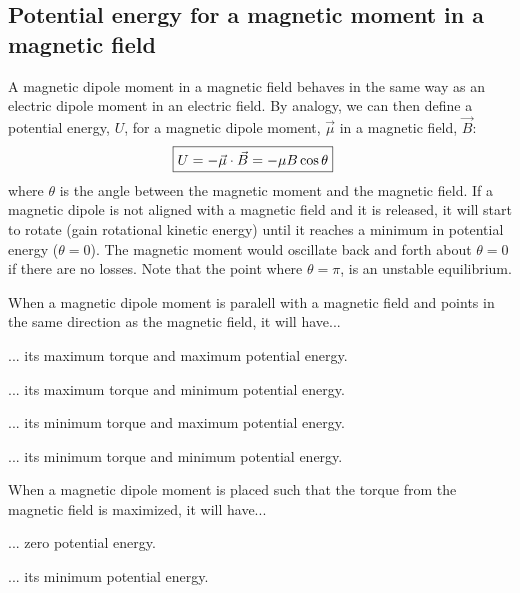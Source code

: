 \subsection{Potential energy for a magnetic moment in a magnetic field}
A magnetic dipole moment in a magnetic field behaves in the same way as an electric dipole moment in an electric field. By analogy, we can then define a potential energy, $U$, for a magnetic dipole moment, $\vec \mu$ in a magnetic field, $\vec B$:
\begin{align*}
\Aboxed{U =-\vec \mu \cdot \vec B =- \mu B \cos\theta}
\end{align*}
where $\theta$ is the angle between the magnetic moment and the magnetic field. If a magnetic dipole is not aligned with a magnetic field and it is released, it will start to rotate (gain rotational kinetic energy) until it reaches a minimum in potential energy ($\theta = 0$). The magnetic moment would oscillate back and forth about $\theta =0$ if there are no losses. Note that the point where $\theta = \pi$, is an unstable equilibrium.
\begin{checkpoint}{}
	\begin{MCquestion}{When a magnetic dipole moment is paralell with a magnetic field and points in the same direction as the magnetic field, it will have...}
		\item ... its maximum torque and maximum potential energy.
		\item ... its maximum torque and minimum potential energy.
		\item ... its minimum torque and maximum potential energy.
		\item ... its minimum torque and minimum potential energy. \correct
	\end{MCquestion}
\end{checkpoint}

\begin{checkpoint}{}
	\begin{MCquestion}{When a magnetic dipole moment is placed such that the torque from the magnetic field is maximized, it will have...}
		\item ... zero potential energy. \correct
		\item ... its minimum potential energy.
	\end{MCquestion}
\end{checkpoint}

